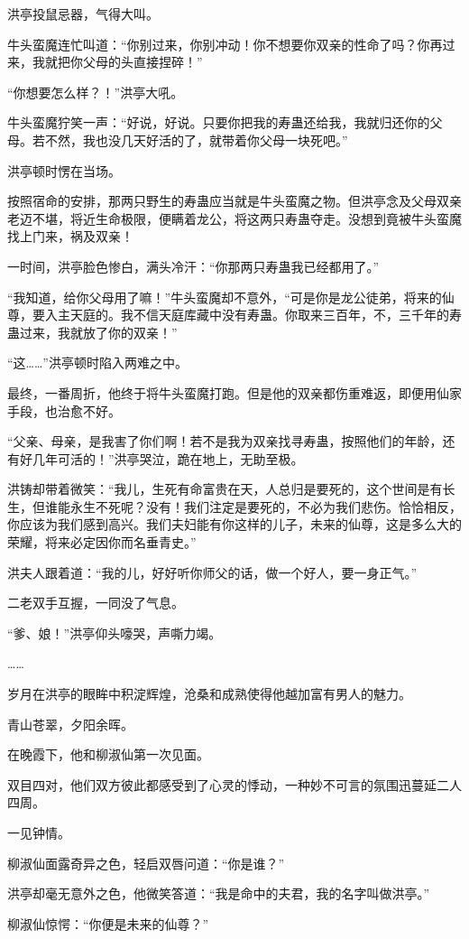 \begin{this_body}
洪亭投鼠忌器，气得大叫。

牛头蛮魔连忙叫道：“你别过来，你别冲动！你不想要你双亲的性命了吗？你再过来，我就把你父母的头直接捏碎！”

“你想要怎么样？！”洪亭大吼。

牛头蛮魔狞笑一声：“好说，好说。只要你把我的寿蛊还给我，我就归还你的父母。若不然，我也没几天好活的了，就带着你父母一块死吧。”

洪亭顿时愣在当场。

按照宿命的安排，那两只野生的寿蛊应当就是牛头蛮魔之物。但洪亭念及父母双亲老迈不堪，将近生命极限，便瞒着龙公，将这两只寿蛊夺走。没想到竟被牛头蛮魔找上门来，祸及双亲！

一时间，洪亭脸色惨白，满头冷汗：“你那两只寿蛊我已经都用了。”

“我知道，给你父母用了嘛！”牛头蛮魔却不意外，“可是你是龙公徒弟，将来的仙尊，要入主天庭的。我不信天庭库藏中没有寿蛊。你取来三百年，不，三千年的寿蛊过来，我就放了你的双亲！”

“这……”洪亭顿时陷入两难之中。

最终，一番周折，他终于将牛头蛮魔打跑。但是他的双亲都伤重难返，即便用仙家手段，也治愈不好。

“父亲、母亲，是我害了你们啊！若不是我为双亲找寻寿蛊，按照他们的年龄，还有好几年可活的！”洪亭哭泣，跪在地上，无助至极。

洪铸却带着微笑：“我儿，生死有命富贵在天，人总归是要死的，这个世间是有长生，但谁能永生不死呢？没有！我们注定是要死的，不必为我们悲伤。恰恰相反，你应该为我们感到高兴。我们夫妇能有你这样的儿子，未来的仙尊，这是多么大的荣耀，将来必定因你而名垂青史。”

洪夫人跟着道：“我的儿，好好听你师父的话，做一个好人，要一身正气。”

二老双手互握，一同没了气息。

“爹、娘！”洪亭仰头嚎哭，声嘶力竭。

……

岁月在洪亭的眼眸中积淀辉煌，沧桑和成熟使得他越加富有男人的魅力。

青山苍翠，夕阳余晖。

在晚霞下，他和柳淑仙第一次见面。

双目四对，他们双方彼此都感受到了心灵的悸动，一种妙不可言的氛围迅蔓延二人四周。

一见钟情。

柳淑仙面露奇异之色，轻启双唇问道：“你是谁？”

洪亭却毫无意外之色，他微笑答道：“我是命中的夫君，我的名字叫做洪亭。”

柳淑仙惊愕：“你便是未来的仙尊？”


\end{this_body}
